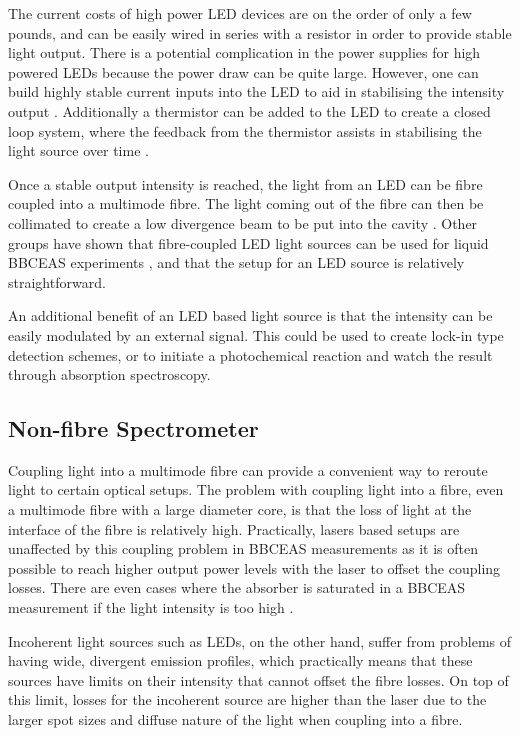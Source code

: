 The current costs of high power \ac{LED} devices are on the order of only a few
pounds, and can be easily wired in series with a resistor in order to provide
stable light output. There is a potential complication in the power supplies
for high powered \acp{LED} because the power draw can be quite large.  However,
one can build highly stable current inputs into the \ac{LED} to aid in
stabilising the intensity output \cite{patent_const_current}. Additionally a
thermistor can be added to the \ac{LED} to create a closed loop system, where
the feedback from the thermistor assists in stabilising the light source over
time \cite{Wieman:2000vd}.

Once a stable output intensity is reached, the light from an \ac{LED} can be
fibre coupled into a multimode fibre. The light coming out of the fibre can
then be collimated to create a low divergence beam to be put into the cavity
\cite{Berden:2009wk}.  Other groups have shown that fibre-coupled \ac{LED}
light sources can be used for liquid \ac{BBCEAS} experiments
\cite{Islam:2007ea,Seetohul:2009du}, and that the setup for an \ac{LED} source
is relatively straightforward.

An additional benefit of an \ac{LED} based light source is that the intensity
can be easily modulated by an external signal. This could be used to create
lock-in type detection schemes, or to initiate a photochemical reaction and
watch the result through absorption spectroscopy.



\subsection{Non-fibre Spectrometer}\label{subsec:bbceas_no_fibre}

Coupling light into a multimode fibre can provide a convenient way to reroute
light to certain optical setups. The problem with coupling light into a fibre,
even a multimode fibre with a large diameter core, is that the loss of light
at the interface of the fibre is relatively high. Practically, lasers based
setups are unaffected by this coupling problem in \ac{BBCEAS} measurements
as it is often possible to reach higher output power levels with the laser
to offset the coupling losses. There are even cases where the absorber is
saturated in a \ac{BBCEAS} measurement if the light intensity is too high
\cite{Giuliano:1967hw}.

Incoherent light sources such as \acp{LED}, on the other hand, suffer from
problems of having wide, divergent emission profiles, which practically means
that these sources have limits on their intensity that cannot offset the fibre
losses. On top of this limit, losses for the incoherent source are higher than
the laser due to the larger spot sizes and diffuse nature of the light when
coupling into a fibre.

